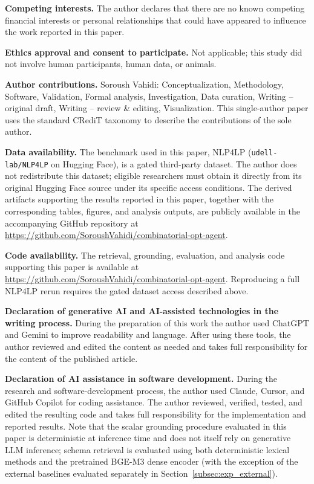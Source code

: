 \documentclass[pdflatex,sn-basic,Numbered]{sn-jnl}
\begin{document}
\noindent\textbf{Competing interests.} The author declares that there are no known competing financial interests or personal relationships that could have appeared to influence the work reported in this paper.

\noindent\textbf{Ethics approval and consent to participate.} Not applicable; this study did not involve human participants, human data, or animals.

\noindent\textbf{Author contributions.} Soroush Vahidi: Conceptualization, Methodology, Software, Validation, Formal analysis, Investigation, Data curation, Writing -- original draft, Writing -- review \& editing, Visualization. This single-author paper uses the standard CRediT taxonomy to describe the contributions of the sole author.

\noindent\textbf{Data availability.} The benchmark used in this paper, NLP4LP (\texttt{udell-lab/NLP4LP} on Hugging Face), is a gated third-party dataset. The author does not redistribute this dataset; eligible researchers must obtain it directly from its original Hugging Face source under its specific access conditions. The derived artifacts supporting the results reported in this paper, together with the corresponding tables, figures, and analysis outputs, are publicly available in the accompanying GitHub repository at \url{https://github.com/SoroushVahidi/combinatorial-opt-agent}.

\noindent\textbf{Code availability.} The retrieval, grounding, evaluation, and analysis code supporting this paper is available at \url{https://github.com/SoroushVahidi/combinatorial-opt-agent}. Reproducing a full NLP4LP rerun requires the gated dataset access described above.

\noindent\textbf{Declaration of generative AI and AI-assisted technologies in the writing process.} During the preparation of this work the author used ChatGPT and Gemini to improve readability and language. After using these tools, the author reviewed and edited the content as needed and takes full responsibility for the content of the published article.

\noindent\textbf{Declaration of AI assistance in software development.} During the research and software-development process, the author used Claude, Cursor, and GitHub Copilot for coding assistance. The author reviewed, verified, tested, and edited the resulting code and takes full responsibility for the implementation and reported results. Note that the scalar grounding procedure evaluated in this paper is deterministic at inference time and does not itself rely on generative LLM inference; schema retrieval is evaluated using both deterministic lexical methods and the pretrained BGE-M3 dense encoder (with the exception of the external baselines evaluated separately in Section~\ref{subsec:exp_external}).


\end{document}

